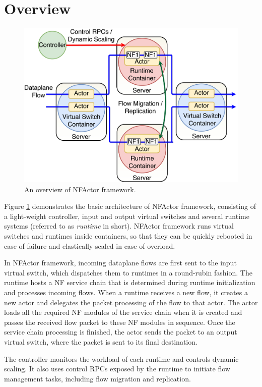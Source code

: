 \section {Overview}

\begin{figure}[!t]
  \centering
  \includegraphics[width=\columnwidth]{figure/new-nfactor-cluster.pdf}
  \caption{An overview of NFActor framework.}
  \label{fig:runtime}
\end{figure}

Figure \ref{fig:runtime} demonstrates the basic architecture of NFActor framework, consisting of a light-weight controller, input and output virtual switches and several runtime systems (referred to as \textit{runtime} in short). NFActor framework runs virtual switches and runtimes inside containers, so that they can be quickly rebooted in case of failure and elastically scaled in case of overload.

In NFActor framework, incoming dataplane flows are first sent to the input virtual switch, which dispatches them to runtimes in a round-rubin fashion. The runtime hosts a NF service chain that is determined during runtime initialization and processes incoming flows. When a runtime receives a new flow, it creates a new actor and delegates the packet processing of the flow to that actor. The actor loads all the required NF modules of the service chain when it is created and passes the received flow packet to these NF modules in sequence. Once the service chain processing is finished, the actor sends the packet to an output virtual switch, where the packet is sent to its final destination.

The controller monitors the workload of each runtime and controls dynamic scaling. It also uses control RPCs exposed by the runtime to initiate flow management tasks, including flow migration and replication.
